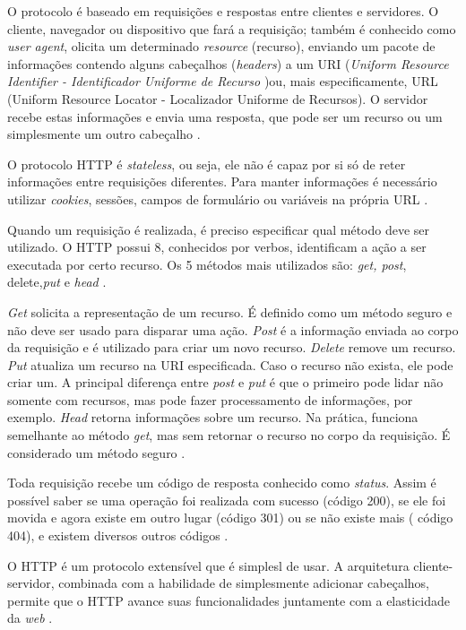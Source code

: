  O protocolo é baseado em requisições e respostas entre clientes e servidores. O cliente, navegador ou dispositivo que fará a requisição; também é conhecido como \textit{user agent}, olicita um determinado  \textit{resource} (recurso), enviando um pacote de informações contendo alguns cabeçalhos (\textit{headers}) a um URI (\textit{Uniform Resource Identifier - Identificador Uniforme de Recurso })ou, mais especificamente, URL (Uniform Resource Locator - Localizador Uniforme de Recursos). O servidor recebe estas informações e envia uma resposta, que pode ser um recurso ou um simplesmente um outro cabeçalho \cite{vieira2007}.
 
 O protocolo HTTP é\textit{ stateless}, ou seja, ele não é capaz por si só de reter informações entre requisições diferentes. Para manter informações é necessário utilizar \textit{cookies}, sessões, campos de formulário ou variáveis na própria URL \cite{vieira2007}.
 
Quando um requisição é realizada, é preciso especificar qual método deve ser utilizado. O HTTP possui 8,  conhecidos por verbos, 
identificam a ação a ser executada por certo recurso.  Os 5 métodos mais utilizados são: \textit{get, post}, delete,\textit{put} e \textit{head} \cite{vieira2007}\cite{szigalski2018}. 

\textit{Get} solicita a representação  de um recurso. É definido como um método seguro e não deve ser usado para disparar uma ação.  \textit{Post} é a informação enviada ao corpo da requisição e é utilizado para criar um novo recurso. \textit{Delete} remove um recurso. \textit{Put} atualiza um recurso na URI especificada. Caso o recurso não exista, ele pode criar um. A principal diferença entre \textit{post} e \textit{put} é que o primeiro pode lidar não somente com recursos, mas pode fazer processamento de informações, por exemplo. \textit{Head} retorna informações sobre um recurso. Na prática, funciona semelhante ao método \textit{get}, mas sem retornar o recurso no corpo da requisição. É considerado um método seguro \cite{vieira2007}.

Toda requisição recebe um código de resposta conhecido como \textit{status}.  Assim é possível saber se uma operação foi realizada com sucesso (código 200), se ele foi movida e agora existe em outro lugar (código 301) ou se não existe mais ( código 404), e existem diversos outros códigos \cite{vieira2007}.

O HTTP é um protocolo extensível que é simplesl de usar. A arquitetura cliente-servidor, combinada com a habilidade de simplesmente adicionar cabeçalhos, permite que o HTTP avance suas funcionalidades juntamente com a elasticidade da \textit{web} \cite{szigalski2018}.



